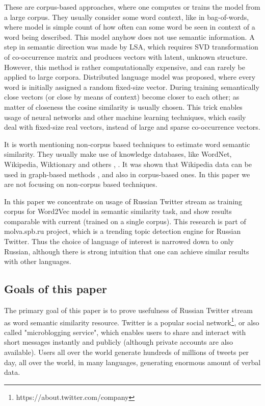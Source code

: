 \documentclass{llncs}
\begin{document}
These are corpus-based approaches, where one computes or trains the model from a large corpus. They usually consider some word context, like in bag-of-words, where model is simple count of how often can some word be seen in context of a word being described. This model anyhow does not use semantic information. A step in semantic direction was made by LSA, which requires SVD transformation of co-occurrence matrix and produces vectors with latent, unknown structure. However, this method is rather computationally expensive, and can rarely be applied to large corpora. Distributed language model was proposed, where every word is initially assigned a random fixed-size vector. During training semantically close vectors (or close by means of context) become closer to each other; as matter of closeness the cosine similarity is usually chosen. This trick enables usage of neural networks and other machine learning techniques, which easily deal with fixed-size real vectors, instead of large and sparse co-occurrence vectors. 

It is worth mentioning non-corpus based techniques to estimate word semantic similarity. They usually make use of knowledge databases, like WordNet, Wikipedia, Wiktionary and others \cite{Zesch}, \cite{Bar}. It was shown that Wikipedia data can be used in graph-based methods \cite{Zesch2007}, and also in corpus-based ones. In this paper we are not focusing on non-corpus based techniques.

In this paper we concentrate on usage of Russian Twitter stream as training corpus for Word2Vec model in semantic similarity task, and show results comparable with current (trained on a single corpus). This research is part of molva.spb.ru project, which is a trending topic detection engine for Russian Twitter. Thus the choice of language of interest is narrowed down to only Russian, although there is strong intuition that one can achieve similar results with other languages.

%
\subsection{Goals of this paper}
%
The primary goal of this paper is to prove usefulness of Russian Twitter stream as word semantic similarity resource. Twitter is a popular social network\footnote{https://about.twitter.com/company}, or also called "microblogging service", which enables users to share and interact with short messages instantly and publicly (although private accounts are also available). Users all over the world generate hundreds of millions of tweets per day, all over the world, in many languages, generating enormous amount of verbal data.
\end{document}
